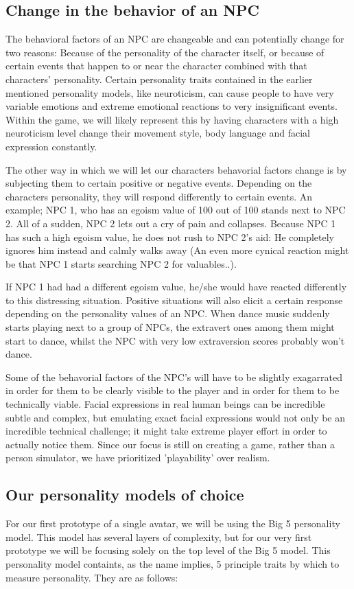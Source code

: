 \documentclass{article}
\begin{document}
  \newpage
  \subsection{Change in the behavior of an NPC}
  The behavioral factors of an NPC are changeable and can potentially change for two reasons: Because of the personality of the character itself, or because of certain events that happen to or near the character combined with that characters' personality. Certain personality traits contained in the earlier mentioned personality models, like neuroticism, can cause people to have very variable emotions and extreme emotional reactions to very insignificant events. Within the game, we will likely represent this by having characters with a high neuroticism level change their movement style, body language and facial expression constantly.

  The other way in which we will let our characters behavorial factors change is by subjecting them to certain positive or negative events. Depending on the characters personality, they will respond differently to certain events. An example; NPC 1, who has an egoism value of 100 out of 100 stands next to NPC 2. All of a sudden, NPC 2 lets out a cry of pain and collapses. Because NPC 1 has such a high egoism value, he does not rush to NPC 2's aid: He completely ignores him instead and calmly walks away (An even more cynical reaction might be that NPC 1 starts searching NPC 2 for valuables..).

  If NPC 1 had had a different egoism value, he/she would have reacted differently to this distressing situation. Positive situations will also elicit a certain response depending on the personality values of an NPC. When dance music suddenly starts playing next to a group of NPCs, the extravert ones among them might start to dance, whilst the NPC with very low extraversion scores probably won't dance. 

  Some of the behavorial factors of the NPC's will have to be slightly exagarrated in order for them to be clearly visible to the player and in order for them to be technically viable. Facial expressions in real human beings can be incredible subtle and complex, but emulating exact facial expressions would not only be an incredible technical challenge; it might take extreme player effort in order to actually notice them. Since our focus is still on creating a game, rather than a person simulator, we have prioritized 'playability' over realism.


  \newpage
  \subsection{Our personality models of choice}
   For our first prototype of a single avatar, we will be using the Big 5 personality model. This model has several layers of complexity, but for our very first prototype we will be focusing solely on the top level of the Big 5 model. This personality model containts, as the name implies, 5 principle traits by which to measure personality. They are as follows:
\end{document}
